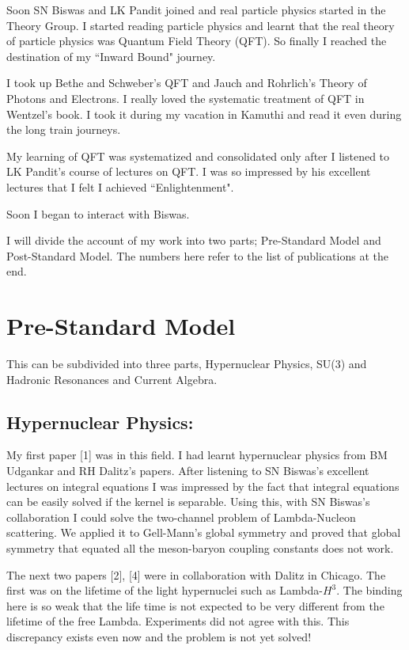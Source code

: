 Soon SN Biswas and LK Pandit joined and real particle physics started in 
the Theory Group. I started reading particle physics and learnt that the 
real theory of particle physics was Quantum Field Theory (QFT). So 
finally I reached the destination of my ``Inward Bound" journey.


I took up Bethe and Schweber's QFT and Jauch and Rohrlich's Theory of 
Photons and Electrons. I really loved the systematic treatment of QFT in 
Wentzel's book. I took it during my vacation in Kamuthi and read it even 
during the long train journeys.


My learning of QFT was systematized and consolidated only after I 
listened to LK Pandit's course of lectures on QFT. I was so impressed by 
his excellent lectures that I felt I achieved ``Enlightenment".


Soon I began to interact with Biswas.


I will divide the account of my work into two parts; Pre-Standard Model 
and Post-Standard Model. The numbers here refer to the list of 
publications at the end.

\section*{Pre-Standard Model}
\vskip -10pt
This can be subdivided into three parts, Hypernuclear Physics, 
SU(3) and Hadronic Resonances and Current Algebra.

\vspace{-\topsep}
\subsection*{Hypernuclear Physics:}

My first paper [1] was in this field. I had learnt hypernuclear physics 
from BM Udgankar and RH Dalitz's papers. After liste\-ning to SN Biswas's 
excellent lectures on integral equations I was impressed by the fact 
that integral equations can be easily solved if the kernel is separable. 
Using this, with SN Biswas's collaboration I could solve the two-channel 
problem of Lambda-Nucleon scattering. We applied it to Gell-Mann's 
global symmetry and proved that global symmetry that equated all the 
meson-baryon coupling constants does not work.

The next two papers [2], [4] were in collaboration with Dalitz in Chicago. 
The first was on the lifetime of the light hypernuclei such as 
Lambda-$H^3$. The binding here is so weak that the life time is not 
expected to be very different from the lifetime of the free Lambda. 
Experiments did not agree with this. This discre\-pancy exists even now 
and the problem is not yet solved!

